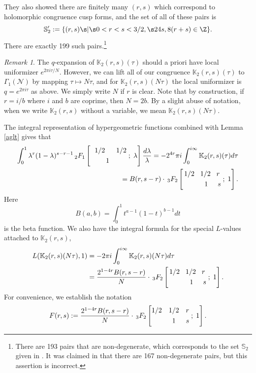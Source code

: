 \documentclass[12pt]{amsart}
\theoremstyle{definition}
\theoremstyle{remark}
\newtheorem{remark}{Remark}
\newcommand*\HYPERskip{&}
\newcommand*\pfq{
\begingroup
\catcode`\,\active
\def ,{\HYPERskip}
\doHyper
}
\def\doHyper#1#2#3#4#5{
\, _{#1}F_{#2}\left[\begin{matrix}#3 \smallskip \\  #4\end{matrix} \; ; \; #5\right]
\endgroup
}
\begin{document}
They also showed there are finitely many $(r,s)$ which correspond to holomorphic  congruence cusp forms, and the set of all of these pairs is \begin{equation}\label{s2}
    \mathbb{S}_2':=\{(r,s)\s|\s 0<r<s<3/2, \s 24s, 8(r+s)\in \Z\}.
\end{equation} There are exactly 199 such pairs.\footnote{There are 193 pairs that are non-degenerate, which corresponds to the set $\mathbb S_2$ given in \cite{aglt}. It was claimed in \cite{aglt} that there are 167 non-degenerate pairs, but this assertion is incorrect.} \begin{remark}
    The $q$-expansion of $\mathbb{K}_2(r,s)(\tau)$ should a priori have local uniformizer  $e^{2\pi i\tau/N}$. However, we can lift all of our congruence $\mathbb{K}_2(r,s)(\tau)$ to $\Gamma_1(\mathcal{N})$ by mapping $\tau\mapsto N\tau$, and for $\mathbb{K}_2(r,s)(N\tau)$ the local uniformizer is $q=e^{2\pi i\tau}$ as above. We simply write $N$ if $r$ is clear. Note that by construction, if $r=i/b$ where $i$ and $b$ are coprime, then $N=2b$. By a slight abuse of notation, when we write $\mathbb{K}_2(r,s)$ without a variable, we mean $\mathbb{K}_2(r,s)(N\tau)$.
\end{remark} 





The integral representation of hypergeometric functions combined with Lemma \ref{aglt} gives that \begin{align}
    \int_0^1\lambda^r(1-\lambda)^{s-r-1}\pfq{2}{1}{1/2,1/2}{\hspace{.8cm}1}{\lambda}\frac{d\lambda}{\lambda}=-2^{4r}\pi i\int_{0}^{i\infty} \mathbb{K}_2(r,s)(\tau)d\tau\\\nonumber=B(r,s-r)\cdot\pfq{3}{2}{1/2\hspace{.3cm}1/2\hspace{.3cm}r}{ \hspace{1.1cm}1\hspace{.5cm}s}{1}.
\end{align} Here $$B(a,b)=\int_0^1t^{a-1}(1-t)^{b-1}dt$$ is the beta function.
      We also have the integral formula for the special $L$-values attached to $\mathbb{K}_2(r,s)$, 
\begin{align}\label{lval}
    L(\mathbb{K}_2(r,s)(N\tau),1)&=-2\pi i\int_{0}^{i\infty} \mathbb{K}_2(r,s)(N\tau)d\tau\\\nonumber&=\frac{2^{1-4r}B(r,s-r)}{N}\cdot\pfq{3}{2}{1/2\hspace{.3cm}1/2\hspace{.3cm}r}{ \hspace{1.1cm}1\hspace{.5cm}s}{1}.
\end{align} For convenience, we establish the notation  \begin{equation}\label{frs}
    F(r,s):=\frac{2^{1-4r}B(r,s-r)}{N}\cdot\pfq{3}{2}{1/2,1/2,r}{,1,s}{1}.
\end{equation}
\end{document}
